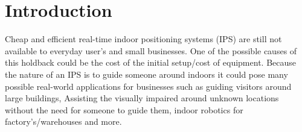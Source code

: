 \section{Introduction }\label{sec:intro}
Cheap and efficient real-time indoor positioning systems (IPS) are still not available to everyday user’s and small businesses. One of the possible causes of this holdback could be the cost of the initial setup/cost of equipment. Because the nature of an IPS is to guide someone around indoors it could pose many possible real-world applications for businesses such as guiding visitors around large buildings, Assisting the visually impaired around unknown locations without the need for someone to guide them, indoor robotics for factory’s/warehouses and more.